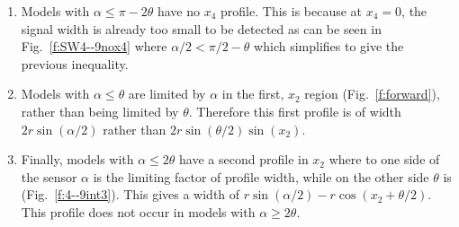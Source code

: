 \begin{enumerate}
\item Models with $\alpha \le \pi - 2\theta$  have no $x_4$ profile. This is because at $x_4 = 0$, the signal width is already too small to be detected as can be seen in Fig.~\ref{f:SW4--9nox4} where $\alpha/2 < \pi/2 - \theta$ which simplifies to give the previous inequality.

\item Models with $\alpha \le \theta$ are limited by $\alpha$ in the first, $x_2$ region (Fig.~\ref{f:forward}), rather than being limited by $\theta$. Therefore this first profile is of width $2r\sin(\alpha/2)$ rather than $2r\sin(\theta/2)\sin(x_2)$.

\item Finally, models with $\alpha \le 2\theta$ have a second profile in $x_2$ where to one side of the sensor $\alpha$ is the limiting factor of profile width, while on the other side $\theta$ is (Fig.~\ref{f:4--9int3}). This gives a width of $r\sin(\alpha/2) - r\cos(x_2 + \theta/2)$. This profile does not occur in models with $\alpha \ge 2\theta$.

\end{enumerate}

